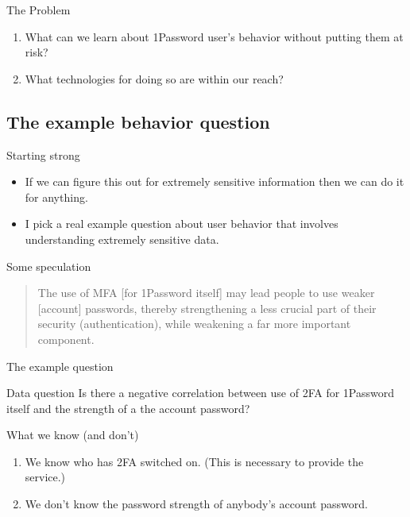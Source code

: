 \documentclass[xcolor={dvipsnames,table,hyperref}]{beamer}
\begin{document}
\begin{frame}{The Problem}
  \begin{enumerate}
    \item What can we learn about 1Password user's behavior without putting them at risk?
    \item What technologies for doing so are within our reach?
  \end{enumerate}
\end{frame}

\subsection{The example behavior question}

\begin{frame}{Starting strong}
  \begin{itemize}
    \item If we can figure this out for extremely sensitive information then we can do it for anything.
    \item I pick a real example question about user behavior that involves understanding extremely sensitive data.
  \end{itemize}
\end{frame}

\begin{frame}{Some speculation}
  \blockcquote{Goldberg18:MFA:pwc}{The use of MFA [for 1Password itself] may lead people to use weaker [account] passwords, thereby strengthening a less crucial part of their security (authentication), while weakening a far more important component.}
\end{frame}

\begin{frame}{The example question}
  \begin{block}{Data question}
    Is there a negative correlation between use of 2FA for 1Password itself and the strength of a the account password?
  \end{block}

\end{frame}

\begin{frame}{What we know (and don't)}
  \begin{enumerate}
    \item We know who has 2FA switched on. (This is necessary to provide the service.)
    \item We don't know the password strength of anybody's account password.
  \end{enumerate}

\end{frame}
\end{document}
